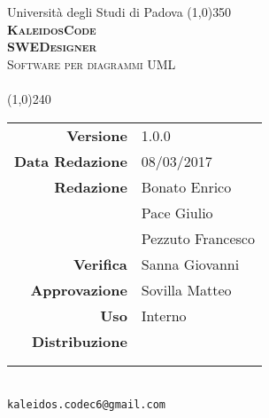 \documentclass[a4paper,12pt]{article}
\author{KaleidosCode}
\date{08/03/2017}	%
\begin{document}
	\begin{titlepage}
		\centering Università degli Studi di Padova
		\line(1,0){350}\\
		\vspace{0.4cm}
		{\bfseries\scshape\LARGE KaleidosCode\\}
		\vspace{0.4cm}
		{\bfseries\scshape\LARGE SWEDesigner\\}
		{\scshape\Large Software per diagrammi UML\\}
		\vspace{1cm}
		{\scshape\Large \studiodifattibilita\ \\}		%
		\vspace{1.4cm}
		\logo
		\vspace{1.2cm}
		\line(1,0){240}\\
		\begin{tabular}{r|l}
			{\hfill \textbf{Versione}} 			& 1.0.0\\
			{\hfill \textbf{Data Redazione}} 	& 08/03/2017\\	%
			{\hfill \textbf{Redazione}} 		& Bonato Enrico\\ & Pace Giulio\\ & Pezzuto Francesco\\
			{\hfill \textbf{Verifica}} 			& Sanna Giovanni\\
			{\hfill \textbf{Approvazione}} 		& Sovilla Matteo\\
			{\hfill \textbf{Uso}} 				& Interno\\
			{\hfill \textbf{Distribuzione}} 	& \vardanega \\ & \cardin \\ & \proponente\\
		\end{tabular}\\
		\vspace{2cm}
		\texttt{kaleidos.codec6@gmail.com}
	\end{titlepage}

	\pagestyle{myfront}
	\newpage
		
	\newpage
		\tableofcontents
	\pagestyle{mymain}
	\newpage
		
	\newpage
		
	\newpage
		
	\newpage
		
	\newpage
		
	\newpage
		
	\newpage
		

	\label{LastPage}
\end{document}
